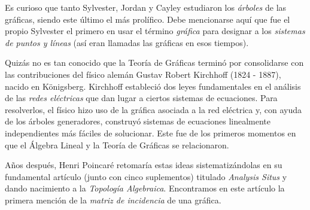 Es curioso que tanto Sylvester, Jordan y Cayley estudiaron los \textit{árboles} de las gráficas, siendo este último el más prolífico. Debe mencionarse aquí que fue el propio Sylvester el primero en usar el término \textit{gráfica} para designar a los \textit{sistemas de puntos y líneas} (así eran llamadas las gráficas en esos tiempos).


Quizás no es tan conocido que la Teoría de Gráficas terminó por consolidarse con las contribuciones del físico alemán Gustav Robert  Kirchhoff (1824 - 1887), nacido en Königsberg. Kirchhoff estableció dos leyes fundamentales en el análisis de las \textit{redes eléctricas} que dan lugar a ciertos sistemas de ecuaciones. Para resolverlos, el físico hizo uso de la gráfica asociada a la red eléctrica y, con ayuda de los árboles generadores, construyó sistemas de ecuaciones linealmente independientes más fáciles de solucionar. Este fue de los primeros momentos en que el Álgebra Lineal y la Teoría de Gráficas se relacionaron.



Años después, Henri Poincaré retomaría estas ideas sistematizándolas en su fundamental artículo (junto con cinco suplementos) titulado \textit{Analysis Situs} y dando nacimiento a la \textit{Topología Algebraica}. Encontramos en este artículo la primera mención de la \textit{matriz de incidencia} de una gráfica.


